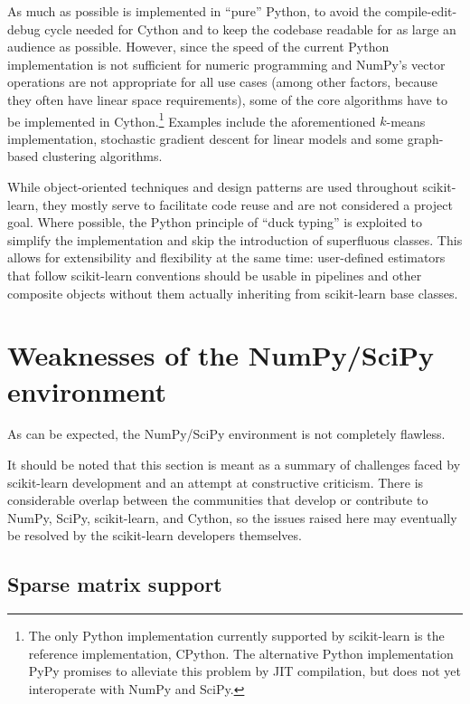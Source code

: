 \documentclass[a4paper,twocolumn]{article}
\begin{document}
As much as possible is implemented in ``pure'' Python,
to avoid the compile-edit-debug cycle needed for Cython
and to keep the codebase readable for as large an audience as possible.
However, since the speed of the current Python implementation
is not sufficient for numeric programming
and NumPy's vector operations are not appropriate for all use cases
(among other factors, because they often have linear space requirements),
some of the core algorithms have to be implemented in Cython.\footnote{
  The only Python implementation currently supported by scikit-learn
  is the reference implementation, CPython.
  The alternative Python implementation PyPy \citep{bolz2009tracing}
  promises to alleviate this problem by JIT compilation,
  but does not yet interoperate with NumPy and SciPy.
}
Examples include the aforementioned $k$-means implementation,
stochastic gradient descent for linear models
and some graph-based clustering algorithms.

While object-oriented techniques and design patterns
are used throughout scikit-learn,
they mostly serve to facilitate code reuse and are not considered a project goal.
Where possible, the Python principle of ``duck typing'' is exploited
to simplify the implementation and skip the introduction of superfluous classes.
This allows for extensibility and flexibility at the same time:
user-defined estimators that follow scikit-learn conventions
should be usable in pipelines and other composite objects
without them actually inheriting from scikit-learn base classes.

\section{Weaknesses of the NumPy/SciPy environment}

As can be expected, the NumPy/SciPy environment is not completely flawless.

It should be noted that this section is meant
as a summary of challenges faced by scikit-learn development
and an attempt at constructive criticism.
There is considerable overlap between the communities
that develop or contribute to NumPy, SciPy, scikit-learn, and Cython,
so the issues raised here may eventually be resolved
by the scikit-learn developers themselves.

\subsection{Sparse matrix support}
\end{document}
